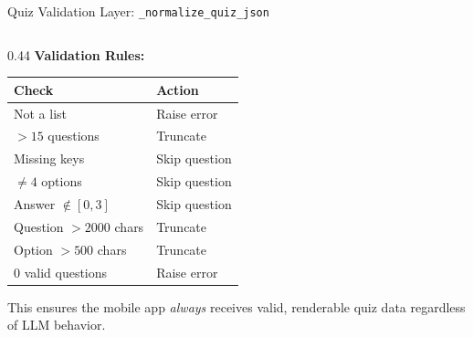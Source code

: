 \documentclass[aspectratio=169,10pt]{beamer}
\begin{document}
\begin{frame}{Quiz Validation Layer: \texttt{\_normalize\_quiz\_json}}
\begin{columns}[T]
\begin{column}{0.44\textwidth}
\vspace{6pt}
\textbf{Validation Rules:}

\vspace{2pt}
\begin{tabular}{@{}ll@{}}
\toprule
\textbf{Check} & \textbf{Action} \\
\midrule
Not a list & Raise error \\
$> 15$ questions & Truncate \\
Missing keys & Skip question \\
$\neq 4$ options & Skip question \\
Answer $\notin [0,3]$ & Skip question \\
Question $> 2000$ chars & Truncate \\
Option $> 500$ chars & Truncate \\
0 valid questions & Raise error \\
\bottomrule
\end{tabular}

\vspace{4pt}
\scriptsize This ensures the mobile app \textit{always} receives valid, renderable quiz data regardless of LLM behavior.
\end{column}
\end{columns}
\end{frame}
\end{document}
